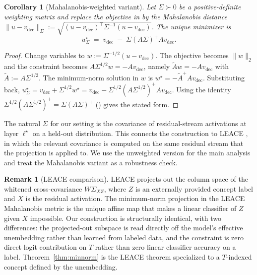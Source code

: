 \documentclass[11pt,letterpaper]{article}
\theoremstyle{plain}
\newtheorem{corollary}[theorem]{Corollary}
\theoremstyle{definition}
\newtheorem{remark}[theorem]{Remark}
\newcommand{\1}{\mathbf{1}}
\newcommand{\vdec}{v_{\text{dec}}}
\begin{document}
\begin{corollary}[Mahalanobis-weighted variant]\label{cor:mahalanobis}
Let $\Sigma \succ 0$ be a positive-definite weighting matrix and replace the objective in  by the Mahalanobis distance $\|u - \vdec\|_\Sigma := \sqrt{(u - \vdec)^\top \Sigma^{-1} (u - \vdec)}$. The unique minimizer is
\begin{equation}
u^\star_\Sigma \;=\; \vdec \;-\; \Sigma (A \Sigma)^+ A \vdec.
\label{eq:mahasoln}
\end{equation}
\end{corollary}

\begin{proof}
Change variables to $w := \Sigma^{-1/2}(u - \vdec)$. The objective becomes $\|w\|_2$ and the constraint becomes $A \Sigma^{1/2} w = -A \vdec$, namely $\widetilde{A} w = -A\vdec$ with $\widetilde{A} := A \Sigma^{1/2}$. The minimum-norm solution in $w$ is $w^\star = -\widetilde{A}^+ A \vdec$. Substituting back, $u^\star_\Sigma = \vdec + \Sigma^{1/2} w^\star = \vdec - \Sigma^{1/2} (A \Sigma^{1/2})^+ A \vdec$. Using the identity $\Sigma^{1/2}(A\Sigma^{1/2})^+ = \Sigma (A\Sigma)^+$ (\cite[Cor.\ 1.4.2]{ben2003generalized}) gives the stated form.
\end{proof}

The natural $\Sigma$ for our setting is the covariance of residual-stream activations at layer $\ell^\star$ on a held-out distribution. This connects the construction to LEACE \cite{belrose2023leace}, in which the relevant covariance is computed on the same residual stream that the projection is applied to. We use the unweighted version for the main analysis and treat the Mahalanobis variant as a robustness check.

\begin{remark}[LEACE comparison]\label{rem:leace}
LEACE projects out the column space of the whitened cross-covariance $W \Sigma_{XZ}$, where $Z$ is an externally provided concept label and $X$ is the residual activation. The minimum-norm projection in the LEACE Mahalanobis metric is the unique affine map that makes a linear classifier of $Z$ given $X$ impossible. Our construction is structurally identical, with two differences: the projected-out subspace is read directly off the model's effective unembedding rather than learned from labeled data, and the constraint is zero direct logit contribution on $T$ rather than zero linear classifier accuracy on a label. Theorem~\ref{thm:minnorm} is the LEACE theorem specialized to a $T$-indexed concept defined by the unembedding.
\end{remark}
\end{document}
